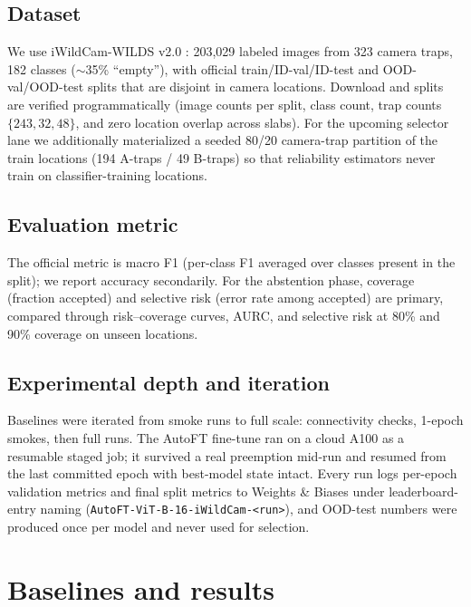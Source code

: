 \documentclass{article}
\begin{document}
\subsection{Dataset}
We use iWildCam-WILDS v2.0 \citep{pmlr-v139-koh21a}: 203{,}029 labeled images from 323
camera traps, 182 classes ($\sim$35\% ``empty''), with official train/ID-val/ID-test and
OOD-val/OOD-test splits that are disjoint in camera locations. Download and splits are
verified programmatically (image counts per split, class count, trap counts
$\{243, 32, 48\}$, and zero location overlap across slabs). For the upcoming selector
lane we additionally materialized a seeded 80/20 camera-trap partition of the train
locations (194 A-traps / 49 B-traps) so that reliability estimators never train on
classifier-training locations.

\subsection{Evaluation metric}
The official metric is macro F1 (per-class F1 averaged over classes present in the
split); we report accuracy secondarily. For the abstention phase, coverage (fraction
accepted) and selective risk (error rate among accepted) are primary, compared through
risk--coverage curves, AURC, and selective risk at 80\% and 90\% coverage on unseen
locations.

\subsection{Experimental depth and iteration}
Baselines were iterated from smoke runs to full scale: connectivity checks, 1-epoch
smokes, then full runs. The AutoFT fine-tune ran on a cloud A100 as a resumable staged
job; it survived a real preemption mid-run and resumed from the last committed epoch with
best-model state intact. Every run logs per-epoch validation metrics and final split
metrics to Weights \& Biases under leaderboard-entry naming
(\texttt{AutoFT-ViT-B-16-iWildCam-<run>}), and OOD-test numbers were produced once per
model and never used for selection.

\section{Baselines and results}
\end{document}
